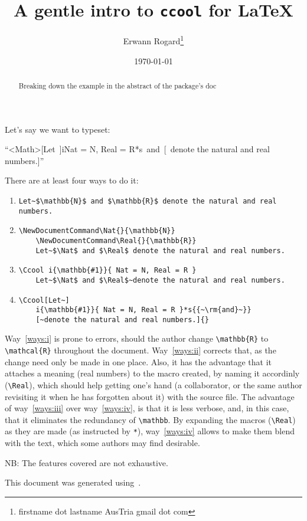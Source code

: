 \documentclass{article}
\title{A gentle intro to \texttt{ccool} for \LaTeX}
\author{Erwann Rogard\thanks{firstname dot lastname AusTria gmail dot com}}
\date{\today}
\providecommand\docways[1]{way~\ref{ways:#1}}
\providecommand\docWays[1]{Way~\ref{ways:#1}}
\begin{document}
\maketitle

\begin{abstract}
  Breaking down the example in the abstract of the package's doc\cite{ccool}
\end{abstract}


Let's say we want to typeset:
\begin{center}
  ``\Ccool<Math>[Let~]i{}{Nat = N, Real = R}*s{{~\rm{and}~}}[~denote the natural and real numbers.]{}''
\end{center}

There are at least four ways to do it:
\begin{enumerate}[label=\emph{\roman*)}]
\item \label{ways:i}
  \begin{Verbatim}[breaklines=true]
    Let~$\mathbb{N}$ and $\mathbb{R}$ denote the natural and real numbers.
  \end{Verbatim}
\item   \label{ways:ii}
  \begin{Verbatim}[breaklines=true]
    \NewDocumentCommand\Nat{}{\mathbb{N}}
    \NewDocumentCommand\Real{}{\mathbb{R}}
    Let~$\Nat$ and $\Real$ denote the natural and real numbers.
  \end{Verbatim}

\item  \label{ways:iii}
  \begin{Verbatim}[breaklines=true]
    \Ccool i{\mathbb{#1}}{ Nat = N, Real = R }
    Let~$\Nat$ and $\Real$~denote the natural and real numbers.
  \end{Verbatim}

\item  \label{ways:iv}
  \begin{Verbatim}[breaklines=true]
    \Ccool[Let~]
    i{\mathbb{#1}}{ Nat = N, Real = R }*s{{~\rm{and}~}}
    [~denote the natural and real numbers.]{}
  \end{Verbatim}
\end{enumerate}

\docWays{i} is prone to errors, should the author change \verb+\mathbb{R}+ to \verb+\mathcal{R}+ throughout the document.
\docWays{ii} corrects that, as the change need only be made in one place.
Also, it has the advantage that it attaches a meaning (real numbers) to the macro created,
by naming it accordinly (\verb|\Real|), which should help getting one's hand (a collaborator,
or the same author revisiting it when he has forgotten about it) with the source file.
The advantage of \docways{iii} over  \docways{iv}, is that it is less verbose,
and, in this case, that it eliminates the redundancy of \verb|\mathbb|.
By expanding the macros (\verb+\Real+) as they are made (as instructed by \verb+*+), \docways{iv} allows to
make them blend with the text, which some authors may find desirable.

NB: The features covered are not exhaustive.

This document was generated using~\CcoolVers.

{}
\printbibliography[heading=subbibliography]
\end{document}
